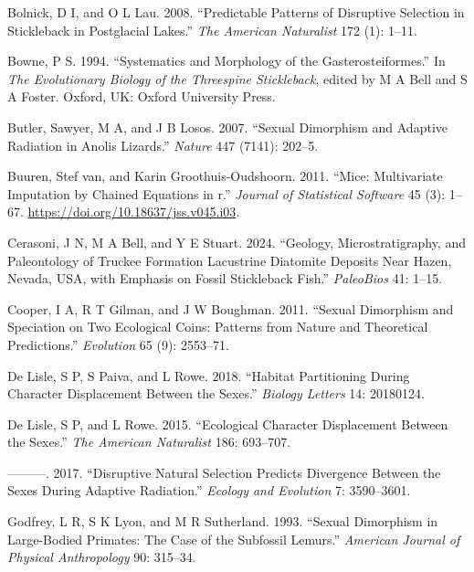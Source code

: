 \documentclass[
  12pt,
]{article}
\newlength{\cslhangindent}
\newlength{\cslentryspacingunit} %
\newenvironment{CSLReferences}[2] %
 {%
  \setlength{\parindent}{0pt}
  \ifodd #1
  \let\oldpar\par
  \def\par{\hangindent=\cslhangindent\oldpar}
  \fi
  \setlength{\parskip}{#2\cslentryspacingunit}
 }%
 {}
\begin{document}
\begin{CSLReferences}{1}{0}
\leavevmode{}%
Bolnick, D I, and O L Lau. 2008. {``Predictable Patterns of Disruptive
Selection in Stickleback in Postglacial Lakes.''} \emph{The American
Naturalist} 172 (1): 1--11.

\leavevmode{}%
Bowne, P S. 1994. {``Systematics and Morphology of the
Gasterosteiformes.''} In \emph{The Evolutionary Biology of the
Threespine Stickleback}, edited by M A Bell and S A Foster. Oxford, UK:
Oxford University Press.

\leavevmode{}%
Butler, Sawyer, M A, and J B Losos. 2007. {``Sexual Dimorphism and
Adaptive Radiation in Anolis Lizards.''} \emph{Nature} 447 (7141):
202--5.

\leavevmode{}%
Buuren, Stef van, and Karin Groothuis-Oudshoorn. 2011. {``Mice:
Multivariate Imputation by Chained Equations in r.''} \emph{Journal of
Statistical Software} 45 (3): 1--67.
\url{https://doi.org/10.18637/jss.v045.i03}.

\leavevmode{}%
Cerasoni, J N, M A Bell, and Y E Stuart. 2024. {``Geology,
Microstratigraphy, and Paleontology of Truckee Formation Lacustrine
Diatomite Deposits Near Hazen, Nevada, USA, with Emphasis on Fossil
Stickleback Fish.''} \emph{PaleoBios} 41: 1--15.

\leavevmode{}%
Cooper, I A, R T Gilman, and J W Boughman. 2011. {``Sexual Dimorphism
and Speciation on Two Ecological Coins: Patterns from Nature and
Theoretical Predictions.''} \emph{Evolution} 65 (9): 2553--71.

\leavevmode{}%
De Lisle, S P, S Paiva, and L Rowe. 2018. {``Habitat Partitioning During
Character Displacement Between the Sexes.''} \emph{Biology Letters} 14:
20180124.

\leavevmode{}%
De Lisle, S P, and L Rowe. 2015. {``Ecological Character Displacement
Between the Sexes.''} \emph{The American Naturalist} 186: 693--707.

\leavevmode{}%
---------. 2017. {``Disruptive Natural Selection Predicts Divergence
Between the Sexes During Adaptive Radiation.''} \emph{Ecology and
Evolution} 7: 3590--3601.

\leavevmode{}%
Godfrey, L R, S K Lyon, and M R Sutherland. 1993. {``Sexual Dimorphism
in Large-Bodied Primates: The Case of the Subfossil Lemurs.''}
\emph{American Journal of Physical Anthropology} 90: 315--34.


\end{CSLReferences}
\end{document}
